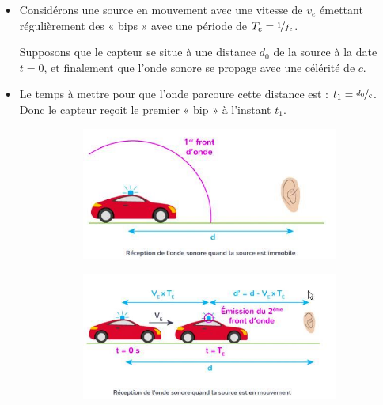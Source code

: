 \documentclass[11pt,a4paper]{article}
\begin{document}
\begin{itemize}
    \item Considérons une source en mouvement avec une vitesse de $v_e$  émettant régulièrement des « bips » avec une période de $T_e=\nicefrac{1}{f_e}$. 
    
    Supposons que le capteur se situe à une distance $d_0$  de la source à la date $t=0$, et finalement que l’onde sonore se propage avec une célérité de $c$.
    \item Le temps à mettre pour que l’onde parcoure cette distance est : $t_1=\nicefrac{d_0}{c}$. Donc le capteur reçoit le premier « bip » à l’instant $t_1$.

\begin{figure}[H]
\centering
\begin{subfigure}{.47\textwidth}
  \centering
  \includegraphics[width=.95\linewidth]{imgs/p5/dop1.jpg}  
\end{subfigure}
\begin{subfigure}{.47\textwidth}
  \centering
  \includegraphics[width=.95\linewidth]{imgs/p5/dop2.jpg}  
\end{subfigure}
\end{figure}


\end{itemize}
\end{document}
